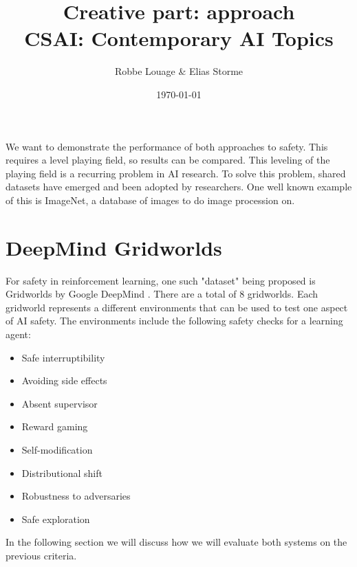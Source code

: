 \documentclass[a4paper,kul]{kulakarticle}
\begin{document}
\title{}
\title{Creative part: approach\\CSAI: Contemporary AI Topics}
\author{Robbe Louage \& Elias Storme}
\date{\today}
\maketitle
\vspace{1.5em}

We want to demonstrate the performance of both approaches to safety. This requires a level 
playing field, so results can be compared. This leveling of the playing field is a recurring 
problem in AI research. To solve this problem, shared datasets have emerged and been adopted by researchers. One well known example of this is ImageNet, a database of images to do image procession on.
\section{DeepMind Gridworlds}
For safety in reinforcement learning, one such "dataset" being proposed is 
Gridworlds by Google DeepMind \cite{leike2017ai}. There are a total of 8 
gridworlds. Each gridworld represents a different environments that can be used to test one aspect of AI safety.
The environments include the following safety checks for a learning agent: 
\begin{multicols}{2}
\begin{itemize}
	\setlength\itemsep{0.25em}
	\item Safe interruptibility
	\item Avoiding side effects
	\item Absent supervisor
	\item Reward gaming
	\item Self-modification
	\item Distributional shift
	\item Robustness to adversaries
	\item Safe exploration
\end{itemize}
\end{multicols}
In the following section we will discuss how we will evaluate both systems on 
the previous criteria.



\end{document}

